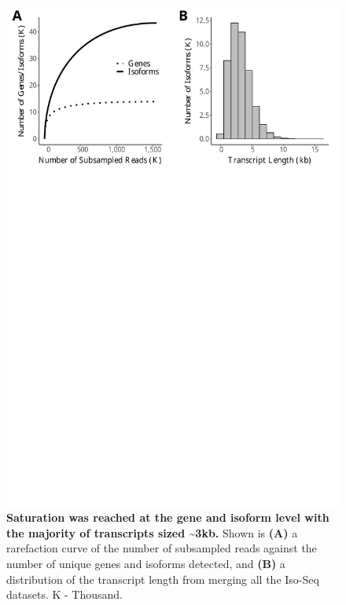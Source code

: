 \vspace{1cm}
\begin{figure}[!h]
	\begin{center}
		\includegraphics[page=1,trim={0 26cm 0 0},clip,scale = 0.55]{Figures/IsoSeqWholeTranscriptome.pdf}
	\end{center}
	\captionsetup{width=0.95\textwidth}
	\caption[Rarefaction curves from global transcriptome profiling of the rTg4510 cortex]%
	{\textbf{Saturation was reached at the gene and isoform level with the majority of transcripts sized \textasciitilde3kb.} Shown is \textbf{(A)} a rarefaction curve of the number of subsampled reads against the number of unique genes and isoforms detected, and \textbf{(B)} a distribution of the transcript length from merging all the Iso-Seq datasets. K - Thousand.}
	\label{fig:isoseq_whole_rarefaction}
\end{figure}

